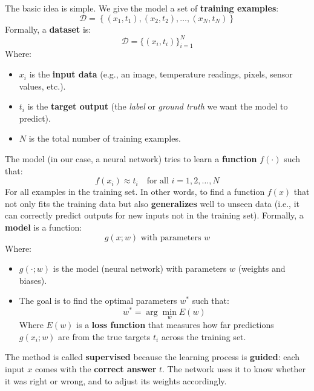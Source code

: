 \highspace
The basic idea is simple. We give the model a set of \textbf{training examples}:
\begin{equation*}
    \mathcal{D} = \left\{
        \left( x_{1}, t_{1} \right),
        \left( x_{2}, t_{2} \right),
        \ldots,
        \left( x_{N}, t_{N} \right)
    \right\}
\end{equation*}
Formally, a \textbf{dataset} is:
\begin{equation}
    \mathcal{D} = \Biggl\{\left(x_{i}, t_{i}\right)\Biggr\}_{i=1}^{N}
\end{equation}
Where:
\begin{itemize}
    \item $x_{i}$ is the \textbf{input data} (e.g., an image, temperature readings, pixels, sensor values, etc.).
    \item $t_{i}$ is the \textbf{target output} (the \emph{label} or \emph{ground truth} we want the model to predict).
    \item $N$ is the total number of training examples.
\end{itemize}
The model (in our case, a neural network) tries to learn a \textbf{function} $f(\cdot)$ such that:
\begin{equation*}
    f\left(x_{i}\right) \approx t_{i} \quad \text{for all } i = 1, 2, \ldots, N
\end{equation*}
For all examples in the training set. In other words, to find a function $f(x)$ that not only fits the training data but also \textbf{generalizes} well to unseen data (i.e., it can correctly predict outputs for new inputs not in the training set). Formally, a \textbf{model} is a function:
\begin{equation}\label{eq:model-function}
    g(x; w) \text{ with parameters } w
\end{equation}
Where:
\begin{itemize}
    \item $g(\cdot; w)$ is the model (neural network) with parameters $w$ (weights and biases).
    \item The goal is to find the optimal parameters $w^{*}$ such that:
    \begin{equation}
        w^{*} = \arg\min_{w} E\left(w\right)
    \end{equation}
    Where $E(w)$ is a \textbf{loss function} that measures how far predictions $g(x_{i}; w)$ are from the true targets $t_{i}$ across the training set.
\end{itemize}
The method is called \textbf{supervised} because the learning process is \textbf{guided}: each input $x$ comes with the \textbf{correct answer} $t$. The network uses it to know whether it was right or wrong, and to adjust its weights accordingly.

